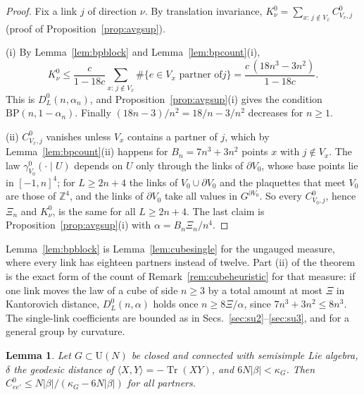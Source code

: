\documentclass[aps,prd,twocolumn,superscriptaddress,nofootinbib,longbibliography,floatfix,amsmath,amssymb,10pt]{revtex4-2}
\newtheorem{lemma}[theorem]{Lemma}
\theoremstyle{definition}
\theoremstyle{remark}
\newcommand{\Z}{\mathbb{Z}}
\newcommand{\U}{\mathrm{U}}
\newcommand{\Tr}{\operatorname{Tr}}
\newcommand{\ip}[2]{\langle #1,#2\rangle}
\begin{document}
\begin{proof}
Fix a link $j$ of direction $\nu$. By translation invariance, $K^0_\nu=
\sum_{x:\,j\notin V_x}C^0_{V_x,j}$ (proof of Proposition~\ref{prop:avgsup}).

(i) By Lemma~\ref{lem:bpblock} and Lemma~\ref{lem:bpcount}(i),
\[
K^0_\nu\le\frac c{1-18c}\sum_{x:\,j\notin V_x}\#\{e\in V_x\text{ partner of
}j\}=\frac{c\,(18n^3-3n^2)}{1-18c}.
\]
This is $D^0_L(n,\alpha_n)$, and Proposition~\ref{prop:avgsup}(i) gives the
condition $\mathrm{BP}(n,1-\alpha_n)$. Finally $(18n-3)/n^2=18/n-3/n^2$
decreases for $n\ge1$.

(ii) $C^0_{V_x,j}$ vanishes unless $V_x$ contains a partner of $j$, which by
Lemma~\ref{lem:bpcount}(ii) happens for $B_n=7n^3+3n^2$ points $x$ with
$j\notin V_x$. The law $\gamma^0_{V_0}(\cdot\mid U)$ depends on $U$ only
through the links of $\partial V_0$, whose base points lie in
$[-1,n]^4$; for $L\ge2n+4$ the links of $V_0\cup\partial V_0$ and the
plaquettes that meet $V_0$ are those of $\Z^4$, and the links of $\partial
V_0$ take all values in $G^{\partial V_0}$. So every $C^0_{V_0,j}$, hence
$\Xi_n$ and $K^0_\nu$, is the same for all $L\ge2n+4$. The last claim is
Proposition~\ref{prop:avgsup}(i) with $\alpha=B_n\Xi_n/n^4$.
\end{proof}

Lemma~\ref{lem:bpblock} is Lemma~\ref{lem:cubesingle} for the ungauged
measure, where every link has eighteen partners instead of twelve. Part (ii)
of the theorem is the exact form of the count of
Remark~\ref{rem:cubeheuristic} for that measure: if one link moves the law
of a cube of side $n\ge3$ by a total amount at most $\Xi$ in Kantorovich
distance, $D^0_L(n,\alpha)$ holds once $n\ge8\Xi/\alpha$, since $7n^3+3n^2\le
8n^3$. The single-link coefficients are bounded as in
Secs.~\ref{sec:su2}--\ref{sec:su3}, and for a general group by curvature.

\begin{lemma}\label{lem:bponelink}
Let $G\subset\U(N)$ be closed and connected with semisimple Lie algebra,
$\delta$ the geodesic distance of $\ip XY=-\Tr(XY)$, and $6N\lvert\beta
\rvert<\kappa_G$. Then $C^0_{ee'}\le N\lvert\beta\rvert/(\kappa_G-6N
\lvert\beta\rvert)$ for all partners.
\end{lemma}
\end{document}
